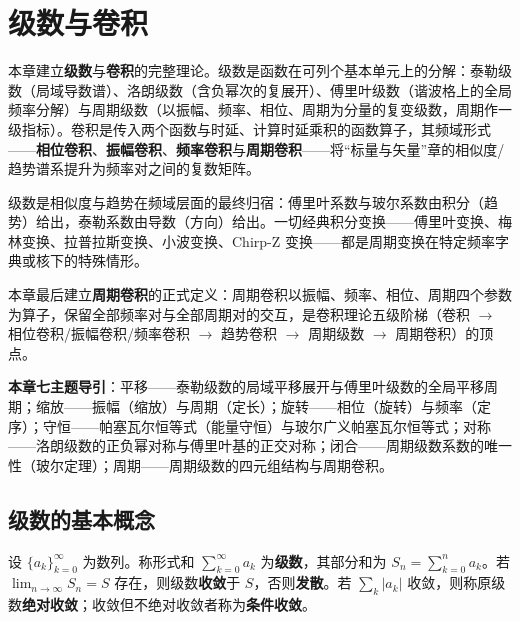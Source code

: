 \chapter{级数与卷积}
\label{chap:series_conv}

\begin{remark}[本章定位]\label{rem:series_chapter_positioning}
本章建立\textbf{级数}与\textbf{卷积}的完整理论。级数是函数在可列个基本单元上的分解：泰勒级数（局域导数谱）、洛朗级数（含负幂次的复展开）、傅里叶级数（谐波格上的全局频率分解）与周期级数（以振幅、频率、相位、周期为分量的复变级数，周期作一级指标）。卷积是传入两个函数与时延、计算时延乘积的函数算子，其频域形式——\textbf{相位卷积}、\textbf{振幅卷积}、\textbf{频率卷积}与\textbf{周期卷积}——将“标量与矢量”章的相似度/趋势谱系提升为频率对之间的复数矩阵。

级数是相似度与趋势在频域层面的最终归宿：傅里叶系数与玻尔系数由积分（趋势）给出，泰勒系数由导数（方向）给出。一切经典积分变换——傅里叶变换、梅林变换、拉普拉斯变换、小波变换、Chirp-Z 变换——都是周期变换在特定频率字典或核下的特殊情形。

本章最后建立\textbf{周期卷积}的正式定义：周期卷积以振幅、频率、相位、周期四个参数为算子，保留全部频率对与全部周期对的交互，是卷积理论五级阶梯（卷积 $\to$ 相位卷积/振幅卷积/频率卷积 $\to$ 趋势卷积 $\to$ 周期级数 $\to$ 周期卷积）的顶点。

\textbf{本章七主题导引}：平移——泰勒级数的局域平移展开与傅里叶级数的全局平移周期；缩放——振幅（缩放）与周期（定长）；旋转——相位（旋转）与频率（定序）；守恒——帕塞瓦尔恒等式（能量守恒）与玻尔广义帕塞瓦尔恒等式；对称——洛朗级数的正负幂对称与傅里叶基的正交对称；闭合——周期级数系数的唯一性（玻尔定理）；周期——周期级数的四元组结构与周期卷积。
\end{remark}

\section{\texorpdfstring{级数的基本概念}{级数的基本概念}}

\begin{definition}[级数与收敛]\label{def:series_basic}
设 $\{a_k\}_{k=0}^{\infty}$ 为数列。称形式和 $\sum_{k=0}^{\infty} a_k$ 为\textbf{级数}，其部分和为 $S_n = \sum_{k=0}^{n} a_k$。若 $\lim_{n\to\infty} S_n = S$ 存在，则级数\textbf{收敛}于 $S$，否则\textbf{发散}。若 $\sum_k |a_k|$ 收敛，则称原级数\textbf{绝对收敛}；收敛但不绝对收敛者称为\textbf{条件收敛}。
\end{definition}

